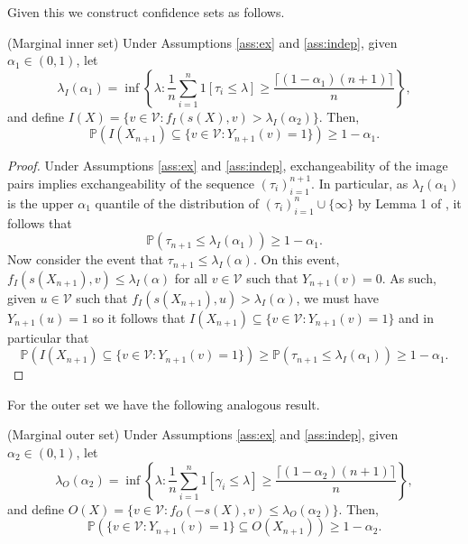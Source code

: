 Given this we construct confidence sets as follows.
\begin{theorem}\label{thm:inner}
	(Marginal inner set)
	Under Assumptions \ref{ass:ex} and \ref{ass:indep}, given $\alpha_1 \in (0,1)$, let 
	\begin{equation*}
		\lambda_I(\alpha_1) = \inf\left\lbrace \lambda: \frac{1}{n} \sum_{i = 1}^n 1\left[ \tau_i\leq \lambda \right] \geq \frac{\lceil (1-\alpha_1)(n+1) \rceil}{n}\right\rbrace,
	\end{equation*}
	and define $I(X) = \lbrace v \in \mathcal{V}: f_I(s(X), v) >\lambda_I(\alpha_2)  \rbrace $. Then,
	\begin{equation}\label{eq:probstat}
		\mathbb{P}\left( I(X_{n+1}) \subseteq\lbrace v\in \mathcal{V}: Y_{n+1}(v) = 1 \rbrace \right) \geq 1 - \alpha_1.
	\end{equation}
\end{theorem}
\begin{proof}
	Under Assumptions \ref{ass:ex} and \ref{ass:indep}, exchangeability of the image pairs implies exchangeability of the sequence $(\tau_i)_{i = 1}^{n+1}$. In particular, as $\lambda_I(\alpha_1)$ is the upper $\alpha_1$ quantile of the distribution of $(\tau_i)_{i = 1}^{n} \cup \lbrace \infty \rbrace $ by Lemma 1 of \cite{Tibshirani2019}, it follows that 
	\begin{equation*}
	\mathbb{P}\left(\tau_{n+1} \leq \lambda_I(\alpha_1) \right) \geq 1 - \alpha_1. 
	\end{equation*}
	Now consider the event that $\tau_{n+1}\leq \lambda_I(\alpha)$. On this event, $ f_I(s(X_{n+1}),v) \leq \lambda_I(\alpha) $
	for all $v \in \mathcal{V}$ such that $Y_{n+1}(v) = 0$. As such, given $u \in \mathcal{V}$ such that $ f_I(s(X_{n+1}), u) > \lambda_I(\alpha) $, we must have $Y_{n+1}(u) = 1$ so it follows that $I(X_{n+1}) \subseteq \lbrace v\in \mathcal{V}: Y_{n+1}(v) = 1 \rbrace  $ and in particular that 
	\begin{equation*}
	\mathbb{P}\left( I(X_{n+1}) \subseteq \lbrace v\in \mathcal{V}: Y_{n+1}(v) = 1 \rbrace  \right) \geq \mathbb{P}\left(\tau_{n+1} \leq \lambda_I(\alpha_1) \right) \geq 1 - \alpha_1. 
\end{equation*}
\end{proof}
\noindent For the outer set we have the following analogous result.
\begin{theorem}\label{thm:outer}
	(Marginal outer set)
	Under Assumptions \ref{ass:ex} and \ref{ass:indep}, given $\alpha_2 \in (0,1)$, let 
	\begin{equation*}
		\lambda_O({\alpha_2})= \inf\left\lbrace \lambda: \frac{1}{n} \sum_{i = 1}^n 1\left[ \gamma_i\leq \lambda \right] \geq \frac{\lceil (1-\alpha_2)(n+1) \rceil}{n} \right\rbrace,
	\end{equation*}
	and define $O(X) = \lbrace v \in \mathcal{V}: f_O(-s(X), v) \leq \lambda_O(\alpha_2)  \rbrace $. Then,
	\begin{equation}\label{eq:probstat}
		\mathbb{P}\left( \lbrace v\in \mathcal{V}: Y_{n+1}(v) = 1 \rbrace \subseteq O(X_{n+1}) \right) \geq 1 - \alpha_2.
	\end{equation}
\end{theorem}
